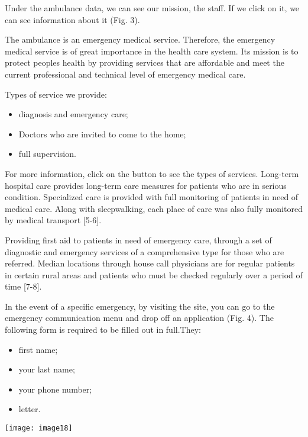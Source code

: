 \begin{multicols}{2}

Under the ambulance data, we can see our mission, the staff. If we click
on it, we can see information about it (Fig. 3).

The ambulance is an emergency medical service. Therefore, the emergency
medical service is of great importance in the health care system. Its
mission is to protect people\textquotesingle s health by providing
services that are affordable and meet the current professional and
technical level of emergency medical care.

Types of service we provide:

\begin{itemize}
\item
  diagnosis and emergency care;
\item
  Doctors who are invited to come to the home;
\item
  full supervision.
\end{itemize}

For more information, click on the button to see the types of services.
Long-term hospital care provides long-term care measures for patients
who are in serious condition. Specialized care is provided with full
monitoring of patients in need of medical care. Along with sleepwalking,
each place of care was also fully monitored by medical transport
{[}5-6{]}.

Providing first aid to patients in need of emergency care, through a set
of diagnostic and emergency services of a comprehensive type for those
who are referred. Median locations through house call physicians are for
regular patients in certain rural areas and patients who must be checked
regularly over a period of time {[}7-8{]}.


In the event of a specific emergency, by visiting the site, you can go
to the emergency communication menu and drop off an application (Fig.
4). The following form is required to be filled out in full.They:

\begin{itemize}
\item
  first name;
\item
  your last name;
\item
  your phone number;
\item
  letter.
\end{itemize}

{\centering
\texttt{[image: image18]}
}


\end{multicols}

